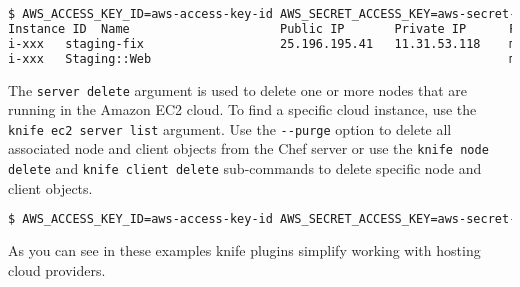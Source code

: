 \begin{lstlisting}[language=Bash,label=lst:knife-plugins5]
$ AWS_ACCESS_KEY_ID=aws-access-key-id AWS_SECRET_ACCESS_KEY=aws-secret-access-key knife ec2 server list
Instance ID  Name                     Public IP       Private IP      Flavor     Image         SSH Key       Security Groups  IAM Profile  State
i-xxx   staging-fix                   25.196.195.41   11.31.53.118    m1.medium  ami-f62cdf9e  some_key      db,web                        running
i-xxx   Staging::Web                                                  m1.medium  ami-3d4ff254  some_key      web                           stopped
\end{lstlisting}

The \lstinline!server delete! argument is used to delete one or more nodes that are running in the Amazon EC2 cloud. To find a specific cloud instance, use the \lstinline!knife ec2 server list! argument. Use the \lstinline!--purge! option to delete all associated node and client objects from the Chef server or use the \lstinline!knife node delete! and \lstinline!knife client delete! sub-commands to delete specific node and client objects.

\begin{lstlisting}[language=Bash,label=lst:knife-plugins6]
$ AWS_ACCESS_KEY_ID=aws-access-key-id AWS_SECRET_ACCESS_KEY=aws-secret-access-key knife ec2 server delete i-xxx
\end{lstlisting}

As you can see in these examples knife plugins simplify working with hosting cloud providers.
